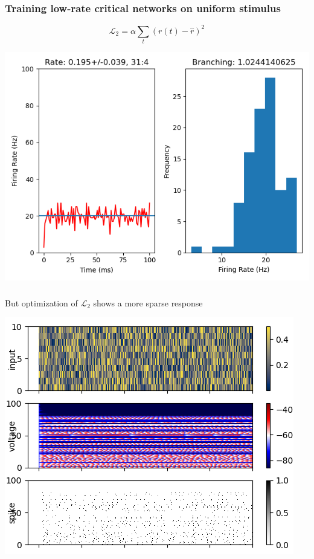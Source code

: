 \documentclass{beamer}
\begin{document}
\begin{frame}[plain]
\frametitle{Training low-rate critical networks on uniform stimulus} 

\begin{equation*}
\mathcal{L}_{2} = \alpha\sum_{t} (r(t) - \hat{r})^{2}
\end{equation*}

\begin{center}
\includegraphics[scale=0.5]{last-epoch}
\end{center}


\end{frame}

\begin{frame}[plain]
\frametitle{} 

But optimization of $\mathcal{L}_{2}$ shows a more sparse response

\begin{center}
\includegraphics[scale=0.7]{alpha-traces}
\end{center}

\end{frame}
\end{document}

